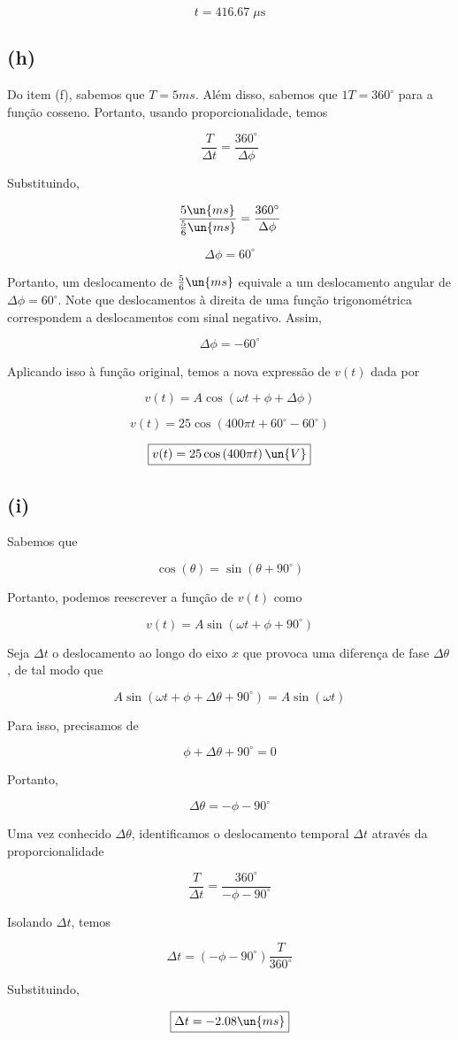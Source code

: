 \[ \boxed{t = 416.67 \;\mu\textrm{s}}  \]

\subsection*{(h)}

Do item (f), sabemos que $T=5ms$. Além disso, sabemos que $1T=360^{\circ}$ para a função cosseno. 
Portanto, usando proporcionalidade, temos

\[ \frac{T}{\Delta t} = \frac{360^{\circ}}{\Delta \phi}  \]

Substituindo,

\[ \frac{5 \un{ms}}{\frac{5}{6} \un{ms}} = \frac{360^{\circ}}{\Delta \phi}  \]

\[ \Delta \phi = 60^{\circ}  \]

Portanto, um deslocamento de $\frac{5}{6} \un{ms}$ equivale a um deslocamento angular de $\Delta \phi = 60^{\circ}$.
Note que deslocamentos à direita de uma função trigonométrica correspondem a deslocamentos com sinal negativo. Assim, 

\[ \Delta \phi = -60^{\circ}  \]

Aplicando isso à função original, temos a nova expressão de $v(t)$ dada por

\[ v(t) = A\cos\left(\omega t + \phi + \Delta \phi\right) \]

\[ v(t) = 25\cos\left(400\pi t + 60^{\circ} - 60^{\circ}\right) \]

\[ \boxed{v(t) = 25\cos\left(400\pi t\right)  \un{V}}  \]

\subsection*{(i)}

Sabemos que

\[ \cos(\theta) = \sin(\theta + 90^{\circ}) \]

Portanto, podemos reescrever a função de $v(t)$ como

\[ v(t) = A\sin\left(\omega t + \phi + 90^{\circ}\right)  \]

Seja $\Delta t$ o deslocamento ao longo do eixo $x$ que provoca uma diferença de fase $\Delta\theta$, de tal modo que

\[ A\sin\left(\omega t + \phi + \Delta\theta + 90^{\circ}\right) =  A\sin\left(\omega t\right)  \]

Para isso, precisamos de

\[ \phi + \Delta\theta + 90^{\circ} = 0 \]

Portanto,

\[ \Delta\theta = - \phi - 90^{\circ} \]

Uma vez conhecido $\Delta\theta$, identificamos o deslocamento temporal $\Delta t$ através da proporcionalidade

\[ \frac{T}{\Delta t} = \frac{360^{\circ}}{- \phi - 90^{\circ}}  \]

Isolando $\Delta t$, temos

\[ \Delta t = (- \phi - 90^{\circ}) \frac{T}{360^{\circ}} \]

Substituindo,

\[ \boxed{\Delta t = - 2.08\un{ms}}  \]

